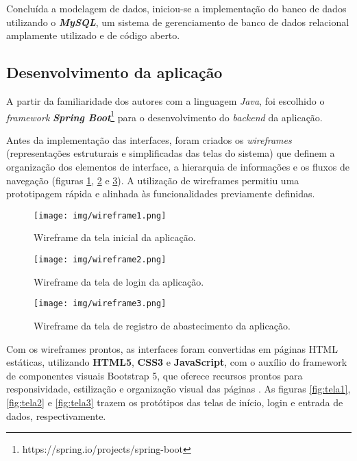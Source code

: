 Concluída a modelagem de dados, iniciou-se a implementação do banco de dados utilizando o \textbf{\textit{MySQL}}, um sistema de gerenciamento de banco de dados relacional amplamente utilizado e de código aberto.



\subsection{Desenvolvimento da aplicação}\label{subsec:DesAplic}

A partir da familiaridade dos autores com a linguagem \textit{Java}, foi escolhido o \textit{framework} \textit{\textbf{Spring Boot}}\footnote{https://spring.io/projects/spring-boot} para o desenvolvimento do \textit{backend} da aplicação. \cite{walls}

Antes da implementação das interfaces, foram criados os \textit{wireframes} (representações estruturais e simplificadas das telas do sistema) que definem a organização dos elementos de interface, a hierarquia de informações e os fluxos de navegação \cite{garret} (figuras \ref{fig:wireframe1}, \ref{fig:wireframe2} e \ref{fig:wireframe3}). A utilização de wireframes permitiu uma prototipagem rápida e alinhada às funcionalidades previamente definidas.

\begin{figure}[htbp!]
    \centering
    \suppressfloats[t]
    \texttt{[image: img/wireframe1.png]}
    \caption{Wireframe da tela inicial da aplicação.}
    \label{fig:wireframe1}
\end{figure}

\begin{figure}[htbp!]
    \centering
    \suppressfloats[t]
    \texttt{[image: img/wireframe2.png]}
    \caption{Wireframe da tela de login da aplicação.}
    \label{fig:wireframe2}
\end{figure}

\begin{figure}[htbp!]
    \centering
    \suppressfloats[t]
    \texttt{[image: img/wireframe3.png]}
    \caption{Wireframe da tela de registro de abastecimento da aplicação.}
    \label{fig:wireframe3}
\end{figure}

Com os wireframes prontos, as interfaces foram convertidas em páginas HTML estáticas, utilizando \textbf{HTML5}, \textbf{CSS3} e \textbf{JavaScript}, com o auxílio do framework de componentes visuais Bootstrap 5, que oferece recursos prontos para responsividade, estilização e organização visual das páginas \cite{bootstrap}. As figuras \ref{fig:tela1}, \ref{fig:tela2} e \ref{fig:tela3} trazem os protótipos das telas de início, login e entrada de dados, respectivamente.
 
